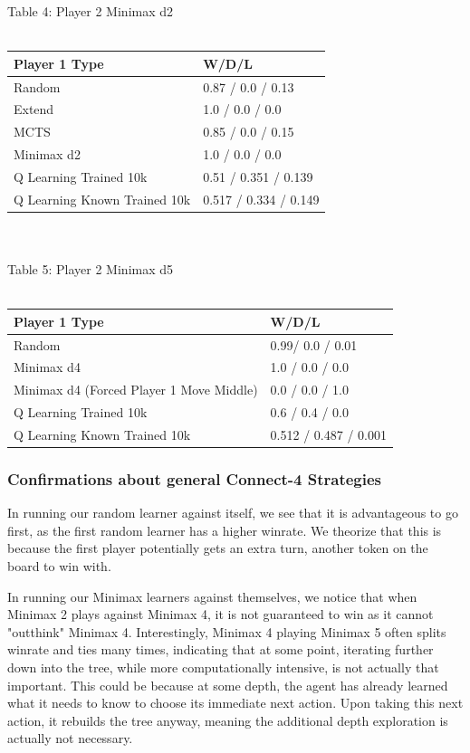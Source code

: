 \documentclass[12pt]{article}
\begin{document}
Table 4: Player 2 Minimax d2\\\\
\begin{tabular}{l|l}
Player 1 Type                & W/D/L                           \\\hline
Random                       &  0.87  / 0.0 / 0.13             \\
Extend                       & 1.0  / 0.0 / 0.0                \\
MCTS & 0.85 / 0.0 / 0.15 \\
Minimax d2                   & 1.0   / 0.0 /  0.0              \\
Q Learning Trained 10k         &  0.51  / 0.351 / 0.139        \\
Q Learning Known Trained 10k & 0.517 / 0.334 / 0.149 
\end{tabular}\\\\
Table 5: Player 2 Minimax d5\\\\
\begin{tabular}{l|l}
Player 1 Type                     & W/D/L               \\\hline
Random                            &  0.99/ 0.0 / 0.01     \\
Minimax d4                        & 1.0 / 0.0 / 0.0       \\
Minimax d4 (Forced Player 1 Move Middle)   & 0.0  / 0.0 / 1.0    \\
Q Learning Trained 10k            & 0.6 / 0.4 / 0.0       \\
Q Learning Known Trained 10k      & 0.512 / 0.487 / 0.001
\end{tabular}

\subsubsection{Confirmations about general Connect-4 Strategies}

In running our random learner against itself, we see that it is advantageous to go first, as the first random learner has a higher winrate. We theorize that this is because the first player potentially gets an extra turn, another token on the board to win with.

In running our Minimax learners against themselves, we notice that when Minimax 2 plays against Minimax 4, it is not guaranteed to win as it cannot "outthink" Minimax 4. Interestingly, Minimax 4 playing Minimax 5 often splits winrate and ties many times, indicating that at some point, iterating further down into the tree, while more computationally intensive, is not actually that important. This could be because at some depth, the agent has already learned what it needs to know to choose its immediate next action. Upon taking this next action, it rebuilds the tree anyway, meaning the additional depth exploration is actually not necessary.
\end{document}
